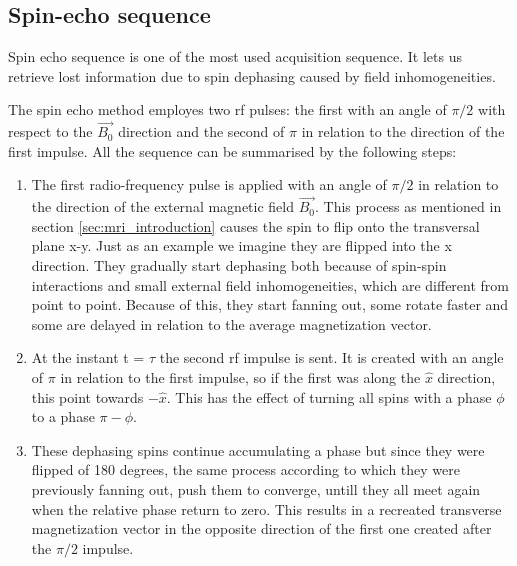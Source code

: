 \documentclass[11pt]{report}
\begin{document}
\subsection{Spin-echo sequence}

Spin echo sequence is one of the most used acquisition sequence. It lets us retrieve lost information due to spin dephasing caused by field inhomogeneities.

The spin echo method employes two rf pulses: the first with an angle of $\pi/2$ with respect to the $\overrightarrow{B_0}$ direction and the second of $\pi$ in relation to the direction of the first impulse.
All the sequence can be summarised by the following steps:
\begin{enumerate}
\item The first radio-frequency pulse is applied with an angle of $\pi/2$ in relation to the direction of the external magnetic field $\overrightarrow{B_0}$. This process as mentioned in section \ref{sec:mri_introduction} causes the spin to flip onto the transversal plane x-y.
Just as an example we imagine they are flipped into the x direction. They gradually start dephasing both because of spin-spin interactions and small external field inhomogeneities, which are different from point to point.
Because of this, they start fanning out, some rotate faster and some are delayed in relation to the average magnetization vector.

\item At the instant t = $\tau $ the second rf impulse is sent. It is created with an angle of $\pi$ in relation to the first impulse, so if the first was along the $\hat x$ direction, this point towards $-\hat x$. This has the effect of turning all spins with a phase $\phi$ to a phase $\pi - \phi$.
\item These dephasing spins continue accumulating a phase but since they were flipped of 180 degrees, the same process according to which they were previously fanning out, push them to converge, untill they all meet again when the relative phase return to zero. This results in a recreated transverse magnetization vector in the opposite direction of the first one created after the $\pi/2$ impulse.
\end{enumerate}
\end{document}
